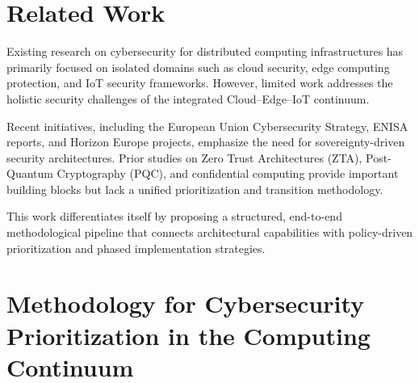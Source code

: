 \documentclass{ieeeaccess}
\begin{document}
 
\section{Related Work}

Existing research on cybersecurity for distributed computing infrastructures has primarily focused on isolated domains such as cloud security, edge computing protection, and IoT security frameworks. However, limited work addresses the holistic security challenges of the integrated Cloud--Edge--IoT continuum.

Recent initiatives, including the European Union Cybersecurity Strategy, ENISA reports, and Horizon Europe projects, emphasize the need for sovereignty-driven security architectures. Prior studies on Zero Trust Architectures (ZTA), Post-Quantum Cryptography (PQC), and confidential computing provide important building blocks but lack a unified prioritization and transition methodology.

This work differentiates itself by proposing a structured, end-to-end methodological pipeline that connects architectural capabilities with policy-driven prioritization and phased implementation strategies.

\newpage

\section{Methodology for Cybersecurity Prioritization in the Computing Continuum}
\label{sec:methodology}
\end{document}
